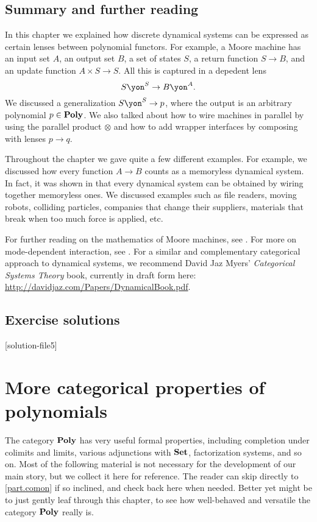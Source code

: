 \documentclass[Book-Poly]{subfiles}
\begin{document}
\section{Summary and further reading}

In this chapter we explained how discrete dynamical systems can be expressed as certain lenses between polynomial functors. For example, a Moore machine has an input set $A$, an output set $B$, a set of states $S$, a return function $S\to B$, and an update function $A\times S\to S$. All this is captured in a depedent lens
\[S\yon^S\to B\yon^A.\]
We discussed a generalization $S\yon^S\to p$, where the output is an arbitrary polynomial $p\in\mathbf{Poly}$. We also talked about how to wire machines in parallel by using the parallel product $\otimes$ and how to add wrapper interfaces by composing with lenses $p\to q$.

Throughout the chapter we gave quite a few different examples. For example, we discussed how every function $A\to B$ counts as a memoryless dynamical system. In fact, it was shown in \cite{beurier2019memoryless} that every dynamical system can be obtained by wiring together memoryless ones. We discussed examples such as file readers, moving robots, colliding particles, companies that change their suppliers, materials that break when too much force is applied, etc.

For further reading on the mathematics of Moore machines, see \cite{conway2012regular}. For more on mode-dependent interaction, see \cite{spivak2017nesting}. For a similar and complementary categorical approach to dynamical systems, we recommend David Jaz Myers' \emph{Categorical Systems Theory} book, currently in draft form here: \url{http://davidjaz.com/Papers/DynamicalBook.pdf}.

\section{Exercise solutions}
{\footnotesize
}

[solution-file5]

\chapter{More categorical properties of polynomials} \label{ch.poly.bonus}

The category $\mathbf{Poly}$ has very useful formal properties, including completion under colimits and limits, various adjunctions with $\mathbf{Set}$, factorization systems, and so on. Most of the following material is not necessary for the development of our main story, but we collect it here for reference. The reader can skip directly to \cref{part.comon} if so inclined, and check back here when needed. Better yet might be to just gently leaf through this chapter, to see how well-behaved and versatile the category $\mathbf{Poly}$ really is.
\end{document}
